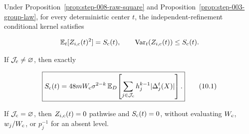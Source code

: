 \begin{lemma}\label{lem:step-010-exact-coarse-square}
Under Proposition~\ref{prop:step-008-raw-square} and
Proposition~\ref{prop:step-003-group-law}, for every deterministic center
\(t\), the independent-refinement conditional kernel satisfies

\[
\mathbb E_t[Z_{i,{\rm c}}(t)^2]=S_{\rm c}(t),
\qquad
\operatorname{Var}_t(Z_{i,{\rm c}}(t))\leq S_{\rm c}(t).
\]

If \(\mathcal J_{\rm c}\neq\varnothing\), then exactly

\[
\boxed{
S_{\rm c}(t)
=48mW_{\rm c}\sigma^{2-k}\,
  \mathbb E_D\!\left[
    \sum_{j\in\mathcal J_{\rm c}}h_j^{k-1}
      |\Delta_j^t(X)|
  \right].
}
\tag{10.1}
\]

If \(\mathcal J_{\rm c}=\varnothing\), then
\(Z_{i,{\rm c}}(t)=0\) pathwise and \(S_{\rm c}(t)=0\), without evaluating
\(W_{\rm c}\), \(w_j/W_{\rm c}\), or \(p_j^{-1}\) for an absent level.
\end{lemma}

